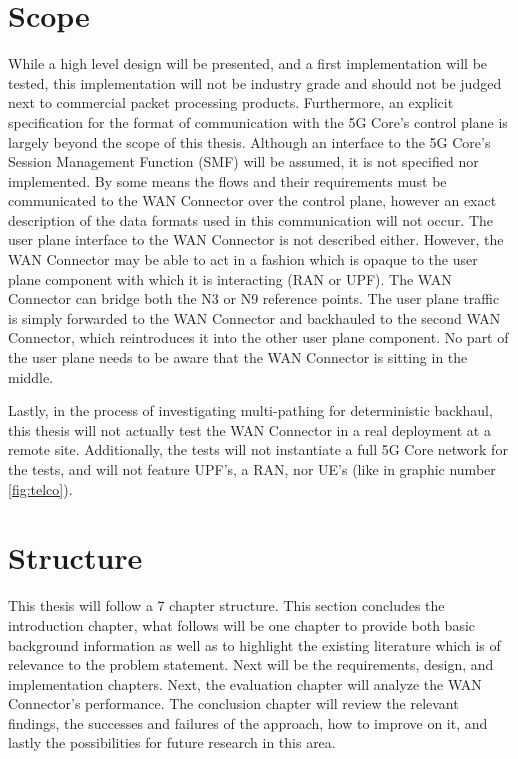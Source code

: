 \section{Scope}
\label{sec:scope}

While a high level design will be presented, and a first implementation will be tested, this implementation will not be industry grade and should not be judged next to commercial packet processing products.  Furthermore, an explicit specification for the format of communication with the 5G Core's control plane is largely beyond the scope of this thesis. Although an interface to the 5G Core's Session Management Function (SMF) will be assumed, it is not specified nor implemented. By some means the flows and their requirements must be communicated to the WAN Connector over the control plane, however an exact description of the data formats used in this communication will not occur. The user plane interface to the WAN Connector is not described either. However, the WAN Connector may be able to act in a fashion which is opaque to the user plane component with which it is interacting (RAN or UPF). The WAN Connector can bridge both the N3 or N9 reference points. The user plane traffic is simply forwarded to the WAN Connector and backhauled to the second WAN Connector, which reintroduces it into the other user plane component. No part of the user plane needs to be aware that the WAN Connector is sitting in the middle.

Lastly, in the process of investigating multi-pathing for deterministic backhaul, this thesis will not actually test the WAN Connector in a real deployment at a remote site. Additionally, the tests will not instantiate a full 5G Core network for the tests, and will not feature UPF's, a RAN, nor UE's (like in graphic number \ref{fig:telco}).

\section{Structure}

This thesis will follow a 7 chapter structure. This section concludes the introduction chapter, what follows will be one chapter to provide both basic background information as well as to highlight the existing literature which is of relevance to the problem statement. Next will be the requirements, design, and implementation chapters. Next, the evaluation chapter will analyze the WAN Connector's performance. The conclusion chapter will review the relevant findings, the successes and failures of the approach, how to improve on it, and lastly the possibilities for future research in this area.




